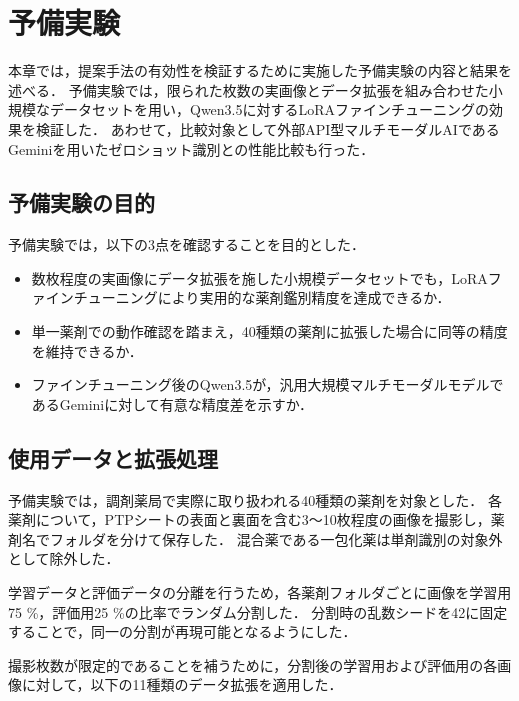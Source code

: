 \documentclass{ltjsarticle}
\begin{document}
\newpage

\section{予備実験}\label{sec4}

本章では，提案手法の有効性を検証するために実施した予備実験の内容と結果を述べる．
予備実験では，限られた枚数の実画像とデータ拡張を組み合わせた小規模なデータセットを用い，Qwen3.5に対するLoRAファインチューニングの効果を検証した．
あわせて，比較対象として外部API型マルチモーダルAIであるGeminiを用いたゼロショット識別との性能比較も行った．

\subsection{予備実験の目的}

予備実験では，以下の3点を確認することを目的とした．

\begin{itemize}
  \item 数枚程度の実画像にデータ拡張を施した小規模データセットでも，LoRAファインチューニングにより実用的な薬剤鑑別精度を達成できるか．
  \item 単一薬剤での動作確認を踏まえ，40種類の薬剤に拡張した場合に同等の精度を維持できるか．
  \item ファインチューニング後のQwen3.5が，汎用大規模マルチモーダルモデルであるGeminiに対して有意な精度差を示すか．
\end{itemize}

\subsection{使用データと拡張処理}

予備実験では，調剤薬局で実際に取り扱われる40種類の薬剤を対象とした．
各薬剤について，PTPシートの表面と裏面を含む3〜10枚程度の画像を撮影し，薬剤名でフォルダを分けて保存した．
混合薬である一包化薬は単剤識別の対象外として除外した．

学習データと評価データの分離を行うため，各薬剤フォルダごとに画像を学習用75 \%，評価用25 \%の比率でランダム分割した．
分割時の乱数シードを42に固定することで，同一の分割が再現可能となるようにした．

撮影枚数が限定的であることを補うために，分割後の学習用および評価用の各画像に対して，以下の11種類のデータ拡張を適用した．
\end{document}
